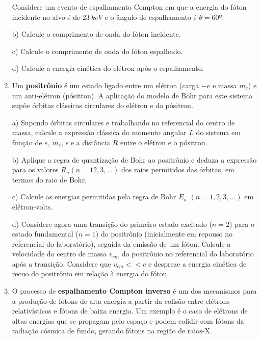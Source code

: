 \begin{enumerate}[start=1,label={\bfseries Q\arabic*.}]
  \resposta

  Considere um evento de espalhamento Compton em que a energia do fóton incidente no alvo é de $23 \ keV$ e o ângulo de espalhamento é $\theta = 60º$.

  b) Calcule o comprimento de onda do fóton incidente.

  \resposta

  c) Calcule o comprimento de onda do fóton espalhado.

  \resposta

  d) Calcule a energia cinética do elétron após o espalhamento.

  \resposta




\item Um \textbf{positrônio} é um estado ligado entre um elétron (carga $-e$ e massa $m_{e}$) e um anti-elétron (pósitron). A aplicação do modelo de Bohr para este sistema supõe órbitas clássicas circulares do elétron e do pósitron.


a) Supondo órbitas circulares e trabalhando no referencial do centro de massa, calcule a expressão clássica do momento angular $L$ do sistema em função de $e$, $m_{e}$, $\epsilon$ e a distância $R$ entre o elétron e o pósitron.

\resposta

b) Aplique a regra de quantização de Bohr ao positrônio e deduza a expressão para os valores $R_{n}(n = 1 2,3,...)$ dos raios permitidos das órbitas, em termos do raio de Bohr.

\resposta

c) Calcule as energias permitidas pela regra de Bohr $E_{n}$ $(n = 1,2,3,...)$ em elétron-volts.

\resposta

d) Considere agora uma transição do primeiro estado excitado ($n = 2$) para o estado fundamental ($n = 1$) do positrônio (inicialmente em repouso no referencial do laboratório), seguida da emissão de um fóton. Calcule a velocidade do centro de massa $v_{cm}$ do positrônio no referencial do laboratório após a transição. Considere que $v_{cm} << c$ e despreze a energia cinética de recuo do positrônio em relação à energia do fóton.

\resposta






\item O processo de \textbf{espalhamento Compton inverso} é um dos mecanismos para a produção de fótons de alta energia a partir da colisão entre elétrons relativísticos e fótons de baixa energia. Um exemplo é o caso de elétrons de altas energias que se propagam pelo espaço e podem colidir com fótons da radiação cósmica de fundo, gerando fótons na região de raios-X.




\end{enumerate}
